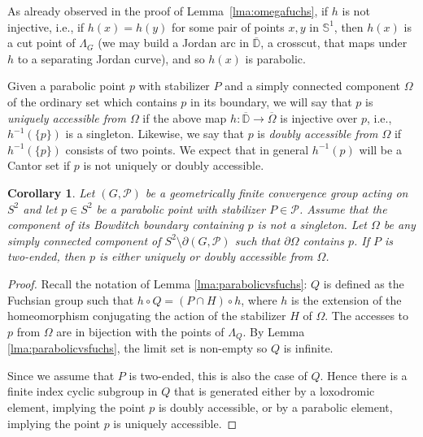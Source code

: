 \documentclass[11pt]{article}
\newtheorem{corollary}[theorem]{Corollary}
\theoremstyle{definition}
\newcommand\PP{\mathcal{P}}
\begin{document}
As already observed in the proof of Lemma~\ref{lma:omegafuchs}, if $h$ is not injective, i.e., if $h(x)=h(y)$ for some pair of points $x,y$ in $\mathbb{S}^1$, then $h(x)$ is a cut point of $\Lambda_G$ (we may build a Jordan arc 
in $\overline{\mathbb{D}}$, a crosscut,  that maps under $h$ to a separating Jordan curve), and so $h(x)$ is parabolic. 

Given a parabolic point $p$ with stabilizer $P$ and a simply connected component $\Omega$ of the ordinary set which
contains $p$ in its boundary, we will say that $p$ is {\it uniquely accessible from $\Omega$} if the above
map $h:\overline{\mathbb{D}}\to\overline{\Omega}$ is injective over $p$, i.e., $h^{-1}(\{p\})$ is 
a singleton.  Likewise, we say that $p$ is {\it doubly accessible from $\Omega$} if $h^{-1}(\{p\})$ consists of two points. We expect that in general $h^{-1}(p)$ will be a Cantor set if $p$ is not uniquely or doubly accessible. 

\begin{corollary} \label{cor:rank1}  
Let $(G,\PP)$ be a geometrically finite convergence group acting on $S^2$ and let $p\in S^2$ be a parabolic point with stabilizer $P\in\PP$. 
Assume that the component of its Bowditch boundary containing $p$ is not a singleton. 
Let $\Omega$ be any simply connected component of $S^2 \setminus \partial(G, \mathcal{P})$ such that $\partial\Omega$ contains $p$. If $P$ is two-ended, then $p$ is either uniquely or doubly accessible from $\Omega$. 
\end{corollary} 

\begin{proof} Recall the notation of Lemma \ref{lma:parabolicvsfuchs}: $Q$ is defined as the Fuchsian group such that $h\circ Q=(P\cap H)\circ h$, 
where $h$ is the extension of the homeomorphism conjugating the action of the stabilizer $H$ of $\Omega$. The accesses to $p$ from $\Omega$ 
are in bijection with the points of $\Lambda_Q$.  By Lemma \ref{lma:parabolicvsfuchs}, the limit set is non-empty so $Q$ is infinite.

Since we assume that $P$ is two-ended, this is also the case of $Q$. Hence there is a finite index cyclic subgroup in $Q$ that is generated either
by a loxodromic element, implying the point $p$ is doubly accessible, or by a parabolic element, 
implying the point $p$ is uniquely accessible.
\end{proof}
\end{document}
